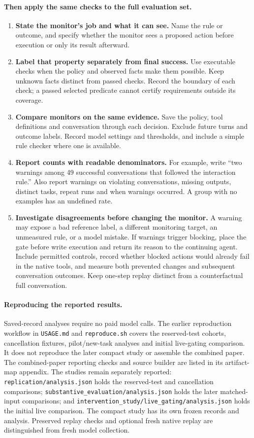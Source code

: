 \paragraph{Then apply the same checks to the full evaluation set.}
\begin{enumerate}
\item \textbf{State the monitor's job and what it can see.} Name the rule or outcome, and specify whether the monitor sees a proposed action before execution or only its result afterward.
\item \textbf{Label that property separately from final success.} Use executable checks when the policy and observed facts make them possible. Keep unknown facts distinct from passed checks. Record the boundary of each check; a passed selected predicate cannot certify requirements outside its coverage.
\item \textbf{Compare monitors on the same evidence.} Save the policy, tool definitions and conversation through each decision. Exclude future turns and outcome labels. Record model settings and thresholds, and include a simple rule checker where one is available.
\item \textbf{Report counts with readable denominators.} For example, write ``two warnings among 49 successful conversations that followed the interaction rule.'' Also report warnings on violating conversations, missing outputs, distinct tasks, repeat runs and when warnings occurred. A group with no examples has an undefined rate.
\item \textbf{Investigate disagreements before changing the monitor.} A warning may expose a bad reference label, a different monitoring target, an unmeasured rule, or a model mistake. If warnings trigger blocking, place the gate before write execution and return its reason to the continuing agent. Include permitted controls, record whether blocked actions would already fail in the native tools, and measure both prevented changes and subsequent conversation outcomes. Keep one-step replay distinct from a counterfactual full conversation.
\end{enumerate}

\paragraph{Reproducing the reported results.}
Saved-record analyses require no paid model calls. The earlier reproduction workflow in \texttt{USAGE.md} and \texttt{reproduce.sh} covers the reserved-test cohorts, cancellation fixtures, pilot/new-task analyses and initial live-gating comparison. It does not reproduce the later compact study or assemble the combined paper. The combined-paper reporting checks and source builder are listed in its artifact-map appendix. The studies remain separately reported: \texttt{replication/analysis.json} holds the reserved-test and cancellation comparisons; \texttt{substantive\_evaluation/analysis.json} holds the later matched-input comparisons; and \texttt{intervention\_study/live\_gating/analysis.json} holds the initial live comparison. The compact study has its own frozen records and analysis. Preserved replay checks and optional fresh native replay are distinguished from fresh model collection.

